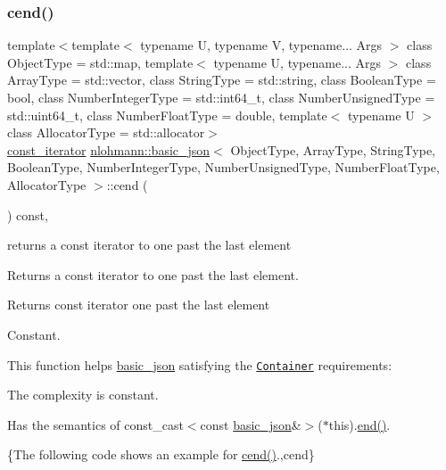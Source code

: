 \subsubsection{\texorpdfstring{cend()}{cend()}}
{\footnotesize\ttfamily template$<$template$<$ typename U, typename V, typename... Args $>$ class Object\+Type = std\+::map, template$<$ typename U, typename... Args $>$ class Array\+Type = std\+::vector, class String\+Type  = std\+::string, class Boolean\+Type  = bool, class Number\+Integer\+Type  = std\+::int64\+\_\+t, class Number\+Unsigned\+Type  = std\+::uint64\+\_\+t, class Number\+Float\+Type  = double, template$<$ typename U $>$ class Allocator\+Type = std\+::allocator$>$ \\
\hyperlink{classnlohmann_1_1basic__json_1_1const__iterator}{const\+\_\+iterator} \hyperlink{classnlohmann_1_1basic__json}{nlohmann\+::basic\+\_\+json}$<$ Object\+Type, Array\+Type, String\+Type, Boolean\+Type, Number\+Integer\+Type, Number\+Unsigned\+Type, Number\+Float\+Type, Allocator\+Type $>$\+::cend (\begin{DoxyParamCaption}{ }\end{DoxyParamCaption}) const\hspace{0.3cm}{\ttfamily [inline]}, {\ttfamily [noexcept]}}



returns a const iterator to one past the last element 

Returns a const iterator to one past the last element.

 \begin{DoxyReturn}{Returns}
const iterator one past the last element
\end{DoxyReturn}
Constant.

This function helps {\ttfamily \hyperlink{classnlohmann_1_1basic__json}{basic\+\_\+json}} satisfying the \href{http://en.cppreference.com/w/cpp/concept/Container}{\tt Container} requirements\+:
\begin{DoxyItemize}
\item The complexity is constant.
\item Has the semantics of {\ttfamily const\+\_\+cast$<$const \hyperlink{classnlohmann_1_1basic__json}{basic\+\_\+json}\&$>$($\ast$this).\hyperlink{classnlohmann_1_1basic__json_a12ccf14d39ddae52f6c7e126105a230b}{end()}}.
\end{DoxyItemize}

\{The following code shows an example for {\ttfamily \hyperlink{classnlohmann_1_1basic__json_aa730d68d55ccc48d2cd4835ff46d2a0f}{cend()}}.,cend\}

